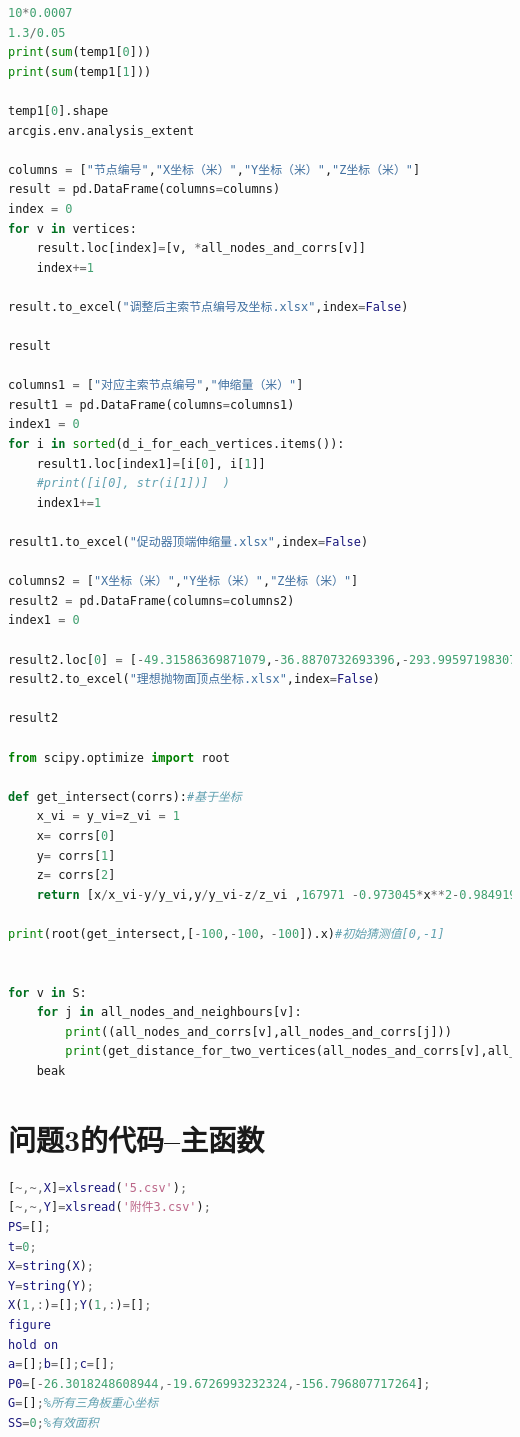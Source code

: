 \documentclass[withoutpreface,bwprint]{cumcmthesis} %
\begin{document}
\begin{appendices}
\begin{lstlisting}[language=python]
10*0.0007
1.3/0.05
print(sum(temp1[0]))
print(sum(temp1[1]))

temp1[0].shape
arcgis.env.analysis_extent

columns = ["节点编号","X坐标（米）","Y坐标（米）","Z坐标（米）"]
result = pd.DataFrame(columns=columns)
index = 0
for v in vertices:
    result.loc[index]=[v, *all_nodes_and_corrs[v]]  
    index+=1

result.to_excel("调整后主索节点编号及坐标.xlsx",index=False)

result

columns1 = ["对应主索节点编号","伸缩量（米）"]
result1 = pd.DataFrame(columns=columns1)
index1 = 0
for i in sorted(d_i_for_each_vertices.items()):
    result1.loc[index1]=[i[0], i[1]]  
    #print([i[0], str(i[1])]  )
    index1+=1

result1.to_excel("促动器顶端伸缩量.xlsx",index=False)

columns2 = ["X坐标（米）","Y坐标（米）","Z坐标（米）"]
result2 = pd.DataFrame(columns=columns2)
index1 = 0

result2.loc[0] = [-49.31586369871079,-36.8870732693396,-293.9959719830742]
result2.to_excel("理想抛物面顶点坐标.xlsx",index=False)

result2

from scipy.optimize import root

def get_intersect(corrs):#基于坐标
    x_vi = y_vi=z_vi = 1
    x= corrs[0]
    y= corrs[1]
    z= corrs[2]
    return [x/x_vi-y/y_vi,y/y_vi-z/z_vi ,167971 -0.973045*x**2-0.984919*y**2 + y*(68.671 + 0.240387*z) + x*(91.8091 + 0.0403239*y+0.321384*z) + 547.321*z - 004203558z**2  ]
   
print(root(get_intersect,[-100,-100，-100]).x)#初始猜测值[0,-1]


for v in S:
    for j in all_nodes_and_neighbours[v]:
        print((all_nodes_and_corrs[v],all_nodes_and_corrs[j]))
        print(get_distance_for_two_vertices(all_nodes_and_corrs[v],all_nodes_and_corrs[j]))
    beak


        \end{lstlisting}

        \section{问题3的代码--主函数}
        \begin{lstlisting}[language=matlab]
            [~,~,X]=xlsread('5.csv');
[~,~,Y]=xlsread('附件3.csv');
PS=[];
t=0;
X=string(X);
Y=string(Y);
X(1,:)=[];Y(1,:)=[];
figure
hold on
a=[];b=[];c=[];
P0=[-26.3018248608944,-19.6726993232324,-156.796807717264];
G=[];%所有三角板重心坐标
SS=0;%有效面积


\end{lstlisting}
\end{appendices}
\end{document}
